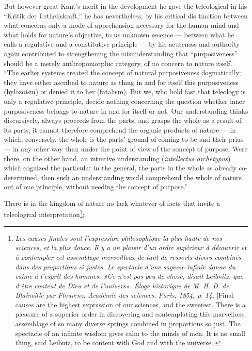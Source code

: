 \documentclass[12pt,a4paper]{book}
\begin{document}
But however great Kant's merit in the development he gave the teleological in
his ``Kritik der Urtheilskraft,'' he has nevertheless, by his critical dis%
\setcounter{footnote}{0}%
tinction between what concerns only a mode of apprehension necessary for the
human mind and what holds for nature's objective, to us unknown essence ---
between what he calls a regulative and a constitutive principle --- by his
acuteness and authority again contributed to strengthening the misunderstanding
that ``purposiveness'' should be a merely anthropomorphic category, of no
concern to nature itself. ``The earlier systems treated the concept of natural
purposiveness dogmatically; they have either ascribed to nature as thing in and
for itself this purposiveness (hylozoism) or denied it to her (fatalism). But
we, who hold fast that teleology is only a regulative principle, decide nothing
concerning the question whether inner purposiveness belongs to nature in and for
itself or not. Our understanding thinks discursively, always proceeds from the
parts, and grasps the whole as a result of its parts; it cannot therefore
comprehend the organic products of nature --- in which, conversely, the whole is
the parts' ground of coming-to-be and their prius --- in any other way than
under the point of view of the concept of purpose. Were there, on the other
hand, an intuitive understanding (\textit{intellectus archetypus}) which
cognized the particular in the general, the parts in the whole as already
co-determined, then such an understanding would comprehend the whole of nature
out of one principle, without needing the concept of purpose.''

There is in the kingdom of nature no lack whatever of facts that invite a
teleological interpretation\footnote{\textit{Les \emph{causes finales} sont
l'expression philosophique la plus haute de nos sciences, et la plus douce. Il y
a un plaisir d'un ordre supérieur à découvrir et à contempler cet assemblage
merveilleux de tant de ressorts divers combinés dans des proportions si justes.
Le spectacle d'une sagesse infinie donne du calme à l'esprit des hommes. »Ce
n'est pas peu de chose, disait Leibnitz, que d'ètre content de Dieu et de
l'univers«. Éloge historique de M. H. D. de Blainville par Flourens. Académie
des sciences. Paris, 1854, p. 14.} [Final causes are the highest expression of
our sciences, and the sweetest. There is a pleasure of a superior order in
discovering and contemplating this marvellous assemblage of so many diverse
springs combined in proportions so just. The spectacle of an infinite wisdom
gives calm to the minds of men. It is no small thing, said Leibniz, to be
content with God and with the universe.]};
\end{document}
